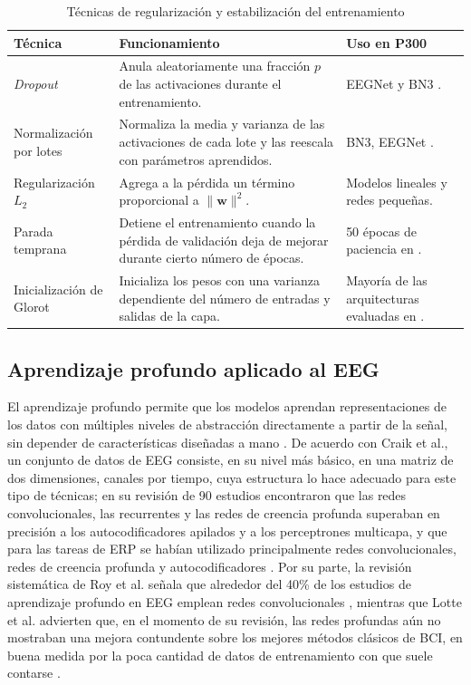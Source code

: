 \begin{table}[htbp]
\centering
\caption{Técnicas de regularización y estabilización del entrenamiento}
\label{tab:regularizacion}
\small
\begin{tabularx}{\textwidth}{L{3.2cm}YY}
\toprule
\textbf{Técnica} & \textbf{Funcionamiento} & \textbf{Uso en P300} \\
\midrule
\textit{Dropout} \cite{srivastava2014} & Anula aleatoriamente una fracción $p$ de las activaciones durante el entrenamiento. & EEGNet y BN3 \cite{lawhern2018,liu2018}. \\
Normalización por lotes \cite{ioffe2015} & Normaliza la media y varianza de las activaciones de cada lote y las reescala con parámetros aprendidos. & BN3, EEGNet \cite{liu2018,lawhern2018}. \\
Regularización $L_2$ & Agrega a la pérdida un término proporcional a $\lVert\mathbf{w}\rVert^2$. & Modelos lineales y redes pequeñas. \\
Parada temprana & Detiene el entrenamiento cuando la pérdida de validación deja de mejorar durante cierto número de épocas. & 50 épocas de paciencia en \cite{alvarado2021}. \\
Inicialización de Glorot \cite{glorot2010} & Inicializa los pesos con una varianza dependiente del número de entradas y salidas de la capa. & Mayoría de las arquitecturas evaluadas en \cite{alvarado2021}. \\
\bottomrule
\end{tabularx}
\par{}
\end{table}

\subsection{Aprendizaje profundo aplicado al EEG}

El aprendizaje profundo permite que los modelos aprendan representaciones de los datos con
múltiples niveles de abstracción directamente a partir de la señal, sin depender de
características diseñadas a mano \cite{lecun2015}. De acuerdo con Craik et al., un conjunto de
datos de EEG consiste, en su nivel más básico, en una matriz de dos dimensiones, canales por tiempo,
cuya estructura lo hace adecuado para este tipo de técnicas; en su revisión de 90 estudios
encontraron que las redes convolucionales, las recurrentes y las redes de creencia profunda
superaban en precisión a los autocodificadores apilados y a los perceptrones multicapa, y que para
las tareas de ERP se habían utilizado principalmente redes convolucionales, redes de creencia
profunda y autocodificadores \cite{craik2019}. Por su parte, la revisión sistemática de Roy et al.
señala que alrededor del 40\% de los estudios de aprendizaje profundo en EEG emplean redes
convolucionales \cite{roy2019}, mientras que Lotte et al. advierten que, en el momento de su revisión, las redes
profundas aún no mostraban una mejora contundente sobre los mejores métodos clásicos de BCI, en
buena medida por la poca cantidad de datos de entrenamiento con que suele contarse
\cite{lotte2018}.
